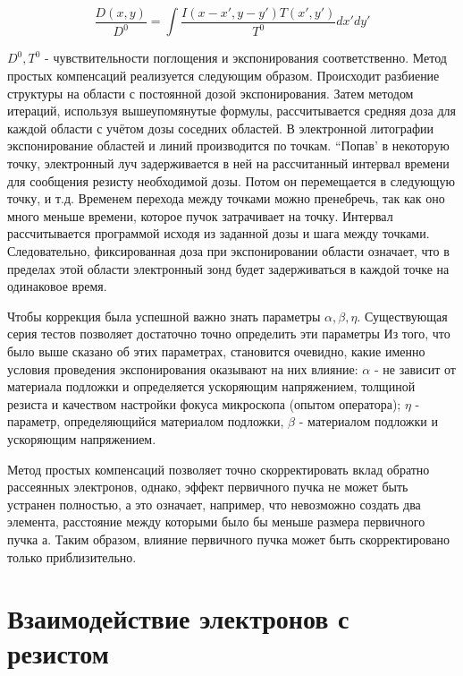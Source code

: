 \begin{equation}
\frac{D(x,y)}{D^0}= \int \frac{I(x-x',y-y')T(x',y')}{T^0} dx' dy'
\label{eq:A9}
\end{equation}

$D^0,T^0$ - чувствительности поглощения и экспонирования соответственно.
Метод простых компенсаций реализуется следующим образом. Происходит разбиение структуры на области с постоянной дозой экспонирования. Затем методом итераций, используя вышеупомянутые формулы, рассчитывается средняя доза для каждой области с учётом дозы соседних областей. В электронной литографии экспонирование областей и линий производится по точкам. “Попав’ в некоторую точку, электронный луч задерживается в ней на рассчитанный интервал времени для сообщения резисту необходимой дозы. Потом он перемещается в следующую точку, и т.д. Временем перехода между точками можно пренебречь, так как оно много меньше времени, которое пучок затрачивает на точку. Интервал рассчитывается программой исходя из заданной дозы и шага между точками. Следовательно, фиксированная доза при экспонировании области означает, что в пределах этой области электронный зонд будет задерживаться в каждой точке на одинаковое время.

Чтобы коррекция была успешной важно знать параметры $\alpha,\beta,\eta$. Существующая серия тестов позволяет достаточно точно определить эти параметры Из того, что было выше сказано об этих параметрах, становится очевидно, какие именно условия проведения экспонирования оказывают на них влияние: $\alpha$ - не зависит от материала подложки и определяется ускоряющим напряжением, толщиной резиста и качеством настройки фокуса микроскопа (опытом оператора); $\eta$ - параметр, определяющийся материалом подложки, $\beta$ - материалом подложки и ускоряющим напряжением.

Метод простых компенсаций позволяет точно скорректировать вклад обратно рассеянных электронов, однако, эффект первичного пучка не может быть устранен полностью, а это означает, например, что невозможно создать два элемента, расстояние между которыми было бы меньше размера первичного пучка а. Таким образом, влияние первичного пучка может быть скорректировано только приблизительно.

\section{Взаимодействие электронов с резистом}

